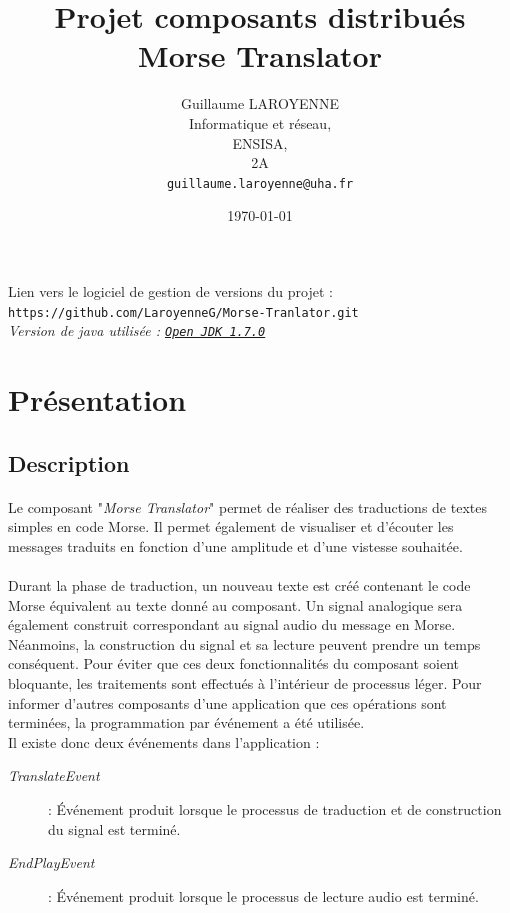 \documentclass[a4paper,11pt]{article}
\title{\LARGE{Projet composants distribués}\\\bigskip \textbf{Morse Translator}}
\author{Guillaume LAROYENNE\\
Informatique et réseau,\\
ENSISA,\\
2A\\
\bigskip
\texttt{guillaume.laroyenne@uha.fr}
}
\date{\today}
\begin{document}
    \maketitle
    \vspace{2cm}
    \begin{center}
        \large{Lien vers le logiciel de gestion de versions du projet :} \texttt{https://github.com/LaroyenneG/Morse-Tranlator.git}
        \\[2cm]
        \textit{Version de java utilisée : \texttt{\underline{Open JDK 1.7.0}}}
    \end{center}

    \newpage

    \tableofcontents

    \newpage

    \section{Présentation}
    \subsection{Description}
    \paragraph{}
    Le composant "\textit{Morse Translator}" permet de réaliser des traductions de textes simples en code Morse. Il permet également de visualiser et d'écouter les messages traduits en fonction d'une amplitude et d'une vistesse souhaitée.
    \paragraph{}
    Durant la phase de traduction, un nouveau texte est créé contenant le code Morse équivalent au texte donné au composant. Un signal analogique sera également construit correspondant au signal audio du message en Morse. Néanmoins, la construction du signal et sa lecture peuvent prendre un temps conséquent. Pour éviter que ces deux fonctionnalités du composant soient bloquante, les traitements sont effectués à l'intérieur de processus léger. Pour informer d'autres composants d'une application que ces opérations sont terminées, la programmation par événement a été utilisée.\\
    Il existe donc deux événements dans l'application :
    \begin{description}
        \item[\textit{TranslateEvent}] : Événement produit lorsque le processus de traduction et de construction du signal est terminé.
        \item[\textit{EndPlayEvent}] : Événement produit lorsque le processus de lecture audio est terminé.
    \end{description}
\end{document}
